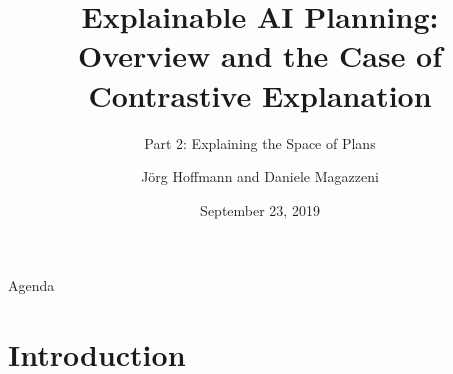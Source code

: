 \title[Explainable AI Planning]{Explainable AI Planning:\\ Overview and the Case of Contrastive Explanation}

\subtitle{Part 2: Explaining the Space of Plans}

\author[Hoffmann and Magazzeni]{J\"org Hoffmann and Daniele Magazzeni}


\date{September 23, 2019}





\frame{\titlepage}

\begin{frame}{Agenda}
\tableofcontents
\end{frame}



%

\section[Introduction]{Introduction}
\subsection*{}

\begin{frame}{}

\end{frame}


